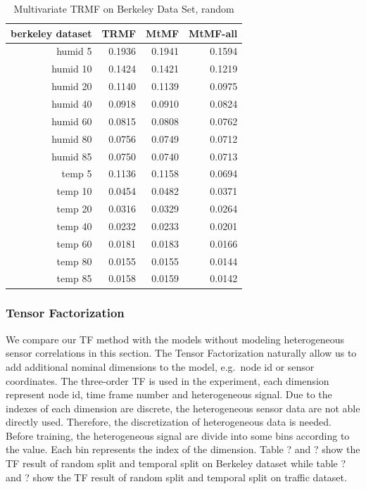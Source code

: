 \begin{table}[htbp]
\caption{Multivariate TRMF on Berkeley Data Set, random}
\label{traffic}
\begin{tabular}{r | r r r}
berkeley dataset	&TRMF	&MtMF	&MtMF-all \\ \hline
humid  5 &0.1936	&0.1941	&0.1594\\
humid 10 &0.1424	&0.1421	&0.1219\\
humid 20 &0.1140	&0.1139	&0.0975\\
humid 40 &0.0918	&0.0910	&0.0824\\
humid 60 &0.0815	&0.0808	&0.0762\\
humid 80 &0.0756	&0.0749	&0.0712\\
humid 85 &0.0750	&0.0740	&0.0713\\
 temp  5 &0.1136	&0.1158	&0.0694\\
 temp 10 &0.0454	&0.0482	&0.0371\\
 temp 20 &0.0316	&0.0329	&0.0264\\
 temp 40 &0.0232	&0.0233	&0.0201\\
 temp 60 &0.0181	&0.0183	&0.0166\\
 temp 80 &0.0155	&0.0155	&0.0144\\
 temp 85 &0.0158	&0.0159	&0.0142
\end{tabular}
\end{table}



\subsubsection{Tensor Factorization}
We compare our TF method with the models without modeling heterogeneous sensor correlations in this section.
The Tensor Factorization naturally allow us to add additional nominal dimensions to the model, e.g.\ node id or sensor coordinates.
The three-order TF is used in the experiment, each dimension represent node id, time frame number and heterogeneous signal.  
Due to the indexes of each dimension are discrete, the heterogeneous sensor data are not able directly used.
Therefore, the discretization of heterogeneous data is needed.
Before training, the heterogeneous signal are divide into some bins according to the value.
Each bin represents the index of the dimension.
Table ? and ? show the TF result of random split and temporal split on Berkeley dataset while table ? and ? show the TF result of random split and temporal split on traffic dataset.

